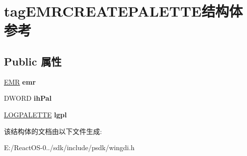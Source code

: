 \hypertarget{structtag_e_m_r_c_r_e_a_t_e_p_a_l_e_t_t_e}{}\section{tag\+E\+M\+R\+C\+R\+E\+A\+T\+E\+P\+A\+L\+E\+T\+T\+E结构体 参考}
\label{structtag_e_m_r_c_r_e_a_t_e_p_a_l_e_t_t_e}
\subsection*{Public 属性}
\begin{DoxyCompactItemize}
\item 
\mbox{\label{structtag_e_m_r_c_r_e_a_t_e_p_a_l_e_t_t_e_ac7161431047426c61f7eb9ab82f0f5e0}} 
\hyperlink{structtag_e_m_r}{E\+MR} {\bfseries emr}
\item 
\mbox{\label{structtag_e_m_r_c_r_e_a_t_e_p_a_l_e_t_t_e_afb637d4e74ab120b204b99effddeccf1}} 
D\+W\+O\+RD {\bfseries ih\+Pal}
\item 
\mbox{\label{structtag_e_m_r_c_r_e_a_t_e_p_a_l_e_t_t_e_a50bf00f1b7deab62f5339e1ff4437e3d}} 
\hyperlink{structtag_l_o_g_p_a_l_e_t_t_e}{L\+O\+G\+P\+A\+L\+E\+T\+TE} {\bfseries lgpl}
\end{DoxyCompactItemize}


该结构体的文档由以下文件生成\+:\begin{DoxyCompactItemize}
\item 
E\+:/\+React\+O\+S-\/0../sdk/include/psdk/wingdi.\+h\end{DoxyCompactItemize}
